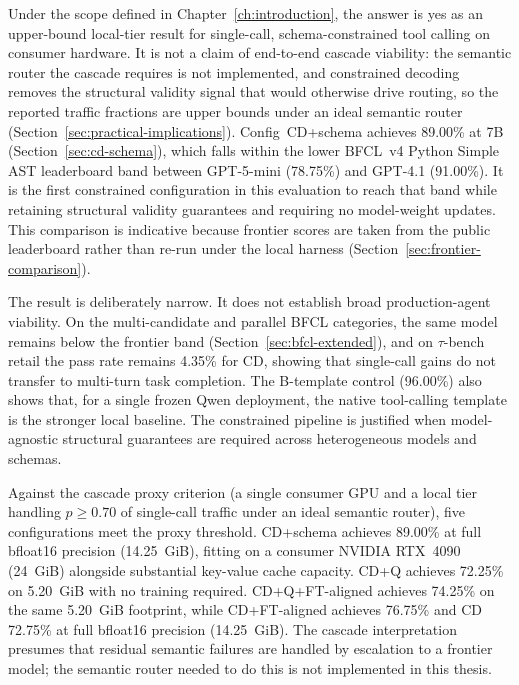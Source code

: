 Under the scope defined in Chapter~\ref{ch:introduction}, the answer is yes as
an upper-bound local-tier result for single-call, schema-constrained tool
calling on consumer hardware. It is not a claim of end-to-end cascade
viability: the semantic router the cascade requires is not implemented, and
constrained decoding removes the structural validity signal that would otherwise
drive routing, so the reported traffic fractions are upper bounds under an
ideal semantic router (Section~\ref{sec:practical-implications}).
Config~CD+schema achieves 89.00\% at 7B (Section~\ref{sec:cd-schema}), which
falls within the lower BFCL~v4 Python Simple AST leaderboard band between
GPT-5-mini (78.75\%) and GPT-4.1 (91.00\%). It is the first constrained
configuration in this evaluation to reach that band while retaining structural
validity guarantees and requiring no model-weight updates. This comparison is
indicative because frontier scores are taken from the public leaderboard rather
than re-run under the local harness (Section~\ref{sec:frontier-comparison}).

The result is deliberately narrow. It does not establish broad production-agent
viability. On the multi-candidate and parallel BFCL categories, the same model
remains below the frontier band (Section~\ref{sec:bfcl-extended}), and on
$\tau$-bench retail the pass rate remains 4.35\% for CD, showing that
single-call gains do not transfer to multi-turn task completion. The B-template
control (96.00\%) also shows that, for a single frozen Qwen deployment, the
native tool-calling template is the stronger local baseline. The constrained
pipeline is justified when model-agnostic structural guarantees are required
across heterogeneous models and schemas.

Against the cascade proxy criterion (a single consumer GPU and a local tier
handling $p \geq 0.70$ of single-call traffic under an ideal semantic router),
five configurations meet the proxy threshold.
CD+schema achieves 89.00\% at full bfloat16 precision (14.25~GiB), fitting on a
consumer NVIDIA RTX~4090 (24~GiB) alongside substantial key-value cache
capacity. CD+Q achieves 72.25\% on 5.20~GiB with no training required.
CD+Q+FT-aligned achieves 74.25\% on the same 5.20~GiB footprint, while
CD+FT-aligned achieves 76.75\% and CD 72.75\% at full bfloat16 precision
(14.25~GiB). The cascade interpretation presumes that residual semantic
failures are handled by escalation to a frontier model; the semantic router
needed to do this is not implemented in this thesis.

